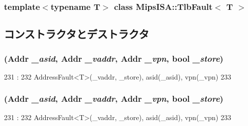 \subsubsection*{template$<$typename T$>$ class MipsISA::TlbFault$<$ T $>$}



\subsection{コンストラクタとデストラクタ}
\hypertarget{classMipsISA_1_1TlbFault_ad6702f244bca94847f8907ae0084f7cc}{
\subsubsection[{TlbFault}]{ ({\bf Addr} {\em \_\-asid}, \/  {\bf Addr} {\em \_\-vaddr}, \/  {\bf Addr} {\em \_\-vpn}, \/  bool {\em \_\-store})}}
\label{classMipsISA_1_1TlbFault_ad6702f244bca94847f8907ae0084f7cc}



\begin{DoxyCode}
231                                                               :
232         AddressFault<T>(_vaddr, _store), asid(_asid), vpn(_vpn)
233     {}

\end{DoxyCode}
\hypertarget{classMipsISA_1_1TlbFault_ad6702f244bca94847f8907ae0084f7cc}{
\subsubsection[{TlbFault}]{ ({\bf Addr} {\em \_\-asid}, \/  {\bf Addr} {\em \_\-vaddr}, \/  {\bf Addr} {\em \_\-vpn}, \/  bool {\em \_\-store})}}
\label{classMipsISA_1_1TlbFault_ad6702f244bca94847f8907ae0084f7cc}



\begin{DoxyCode}
231                                                               :
232         AddressFault<T>(_vaddr, _store), asid(_asid), vpn(_vpn)
233     {}

\end{DoxyCode}


